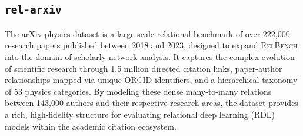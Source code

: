 \documentclass{article} %
\newcommand{\relbench}{\textsc{RelBench}\xspace}
\newcommand{\arxiv}{\texttt{rel-arxiv}\xspace}
\begin{document}
\begin{table}[t]
  \centering
  \caption{{\bf Statistics of  new \relbench datasets.} Datasets vary significantly in the number of tables, total number of rows, and number of columns. In this table, we only count rows available for test inference, i.e., rows up to the test time cutoff.
  }
  \renewcommand{\arraystretch}{1.1}
  \label{tab:stats_datasets}
  \scriptsize
  \vspace{-5pt}
  \resizebox{\textwidth}{!}{
    
  }
  \vspace{-10pt}
\end{table}


\subsection{\arxiv}

The arXiv-physics dataset \citep{arxiv_physics_dataset} is a large-scale relational benchmark of over 222,000 research papers published between 2018 and 2023, designed to expand \relbench into the domain of scholarly network analysis. It captures the complex evolution of scientific research through 1.5 million directed citation links, paper-author relationships mapped via unique ORCID identifiers, and a hierarchical taxonomy of 53 physics categories. By modeling these dense many-to-many relations between 143,000 authors and their respective research areas, the dataset provides a rich, high-fidelity structure for evaluating relational deep learning (RDL) models within the academic citation ecosystem.


\end{document}
